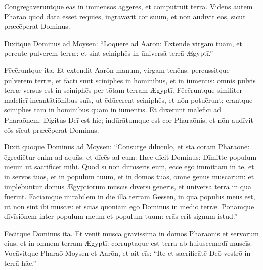 Congregāvēruntque eās in immēnsōs
aggerēs, et computruit terra.  Vidēns autem
Pharaō quod data esset requiēs, ingravāvit cor suum, et nōn
audīvit eōs, sīcut præcēperat Dominus. 

Dīxitque Dominus ad Moysēn: ``Loquere ad Aarōn: Extende
virgam tuam, et percute pulverem terræ: et sint
sciniphēs in ūniversā terrā Ægyptī.''

Fēcēruntque ita. Et
extendit Aarōn manum, virgam tenēns: percussitque pulverem
terræ, et factī sunt sciniphēs in hominibus, et in
iūmentīs: omnis pulvis terræ versus est in
sciniphēs per tōtam terram Ægyptī.  Fēcēruntque
similiter maleficī
incantātiōnibus suīs, ut ēdūcerent
sciniphēs, et nōn potuērunt: erantque
sciniphēs tam in hominibus quam in
iūmentīs.  Et dīxērunt maleficī ad
Pharaōnem: Digitus Deī est hic; indūrātumque est cor Pharaōnis, et nōn audīvit eōs
sīcut præcēperat Dominus.  

Dīxit quoque
Dominus ad Moysēn: ``Cōnsurge
dīlūculō, et stā cōram Pharaōne:
ēgrediētur enim ad aquās: et dīcēs ad eum: Hæc dīcit Dominus: Dīmitte
populum meum ut sacrificet mihi.  Quod sī nōn dīmīserīs eum, ecce ego
immittam in tē, et in servōs tuōs,
et in populum tuum, et in domōs tuās, omne genus muscārum:
et implēbuntur domūs Ægyptiōrum muscīs
dīversī generis, et ūniversa terra in quā fuerint. 
Faciamque mīrābilem in diē illa terram Gessen, in quā populus meus est, ut
nōn sint ibi muscæ: et sciās quoniam ego Dominus in mediō
terræ.  Pōnamque dīvīsiōnem inter populum meum et populum
tuum: crās erit signum istud.''

Fēcitque Dominus ita. Et venit
musca gravissima in domōs Pharaōnis et
servōrum eius, et in omnem terram Ægyptī: corruptaque est
terra ab huiuscemodī muscīs.  Vocāvitque
Pharaō Moysen et Aarōn, et ait eīs: ``Īte et
sacrificātē Deō vestrō in terrā hāc.''  


